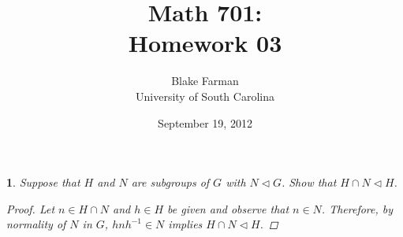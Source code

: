 \documentclass[10pt]{amsart}
\author{Blake Farman\\University of South Carolina}
\title{Math 701:\\Homework 03}
\date{September 19, 2012}
\begin{document}
\maketitle

\newcommand{\Inn}[1]{\operatorname{Inn}\left(#1\right)}
\newcommand{\Aut}[1]{\operatorname{Aut}\left(#1\right)}
\newcommand{\cntr}[1]{\mathbf{Z}\left(#1\right)}
\newcommand{\abs}[1]{\left| #1 \right|}
\newcommand{\SL}[2]{\operatorname{SL}_#1\left(#2\right)}
\newcommand{\Mat}[2]{\operatorname{Mat}_{#1}\left(#2\right)}
\renewcommand{\qedsymbol}{\ensuremath{\blacksquare}}

\newtheorem{thm}{}
\newtheorem{lem}{Lemma}

\begin{thm}
  Suppose that $H$ and $N$ are subgroups of $G$ with $N \lhd G$.
  Show that $H \cap N \lhd H$.
  \begin{proof}
	Let $n \in H \cap N$ and $h \in H$ be given and observe that $n \in N$.
	Therefore, by normality of $N$ in $G$, $hnh^{-1} \in N$ implies $H \cap N \lhd H$.
  \end{proof}
\end{thm}
\end{document}
